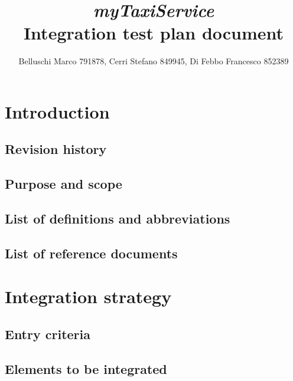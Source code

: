 \documentclass[]{report}
\begin{document}
\title{{\Huge\textit{myTaxiService}}\\{\Large Integration test plan document}}
\author{Belluschi Marco 791878, Cerri Stefano 849945, Di Febbo Francesco 852389}

\maketitle

\tableofcontents

\chapter{Introduction}

	\section{Revision history}
	

	\section{Purpose and scope}
	

	\section{List of definitions and abbreviations}
	

	\section{List of reference documents}
	

\chapter{Integration strategy}

	\section{Entry criteria}
	

	\section{Elements to be integrated}
	
\end{document}

